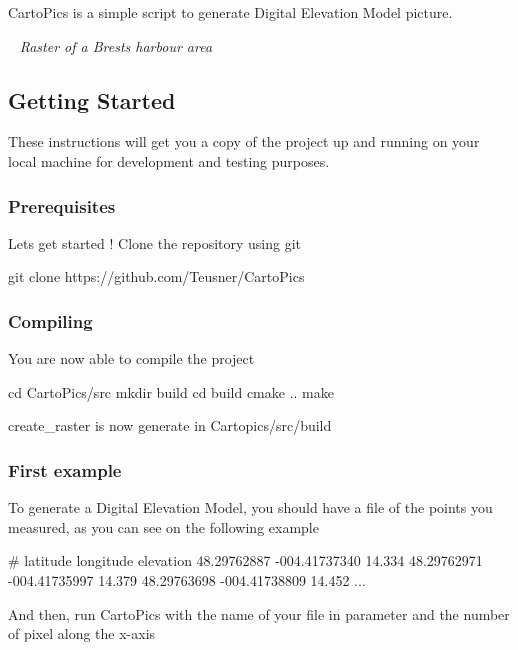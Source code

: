 Carto\+Pics is a simple script to generate Digital Elevation Model picture.

 ~\newline
 {\itshape Raster of a Brest\textquotesingle{}s harbour area} 

\subsection*{Getting Started}

These instructions will get you a copy of the project up and running on your local machine for development and testing purposes.

\subsubsection*{Prerequisites}

Let\textquotesingle{}s get started ! Clone the repository using git


\begin{DoxyCode}
git clone https://github.com/Teusner/CartoPics
\end{DoxyCode}


\subsubsection*{Compiling}

You are now able to compile the project


\begin{DoxyCode}
cd CartoPics/src
mkdir build
cd build
cmake ..
make
\end{DoxyCode}


create\+\_\+raster is now generate in Cartopics/src/build

\subsubsection*{First example}

To generate a Digital Elevation Model, you should have a file of the points you measured, as you can see on the following example


\begin{DoxyCode}
# latitude    longitude  elevation
48.29762887 -004.41737340 14.334
48.29762971 -004.41735997 14.379
48.29763698 -004.41738809 14.452
...
\end{DoxyCode}
 And then, run Carto\+Pics with the name of your file in parameter and the number of pixel along the x-\/axis


